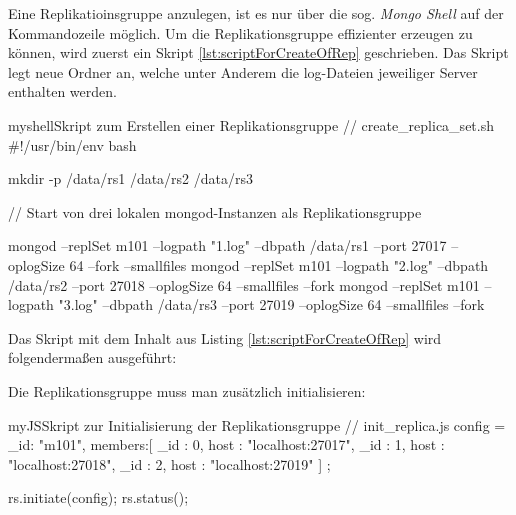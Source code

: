 Eine Replikatioinsgruppe anzulegen, ist es nur über die sog. \textit{Mongo Shell} auf der Kommandozeile möglich. Um die Replikationsgruppe effizienter erzeugen zu können, wird zuerst ein Skript \ref{lst:scriptForCreateOfRep} geschrieben. Das Skript legt neue Ordner an, welche unter Anderem die log-Dateien jeweiliger Server enthalten werden.

\begin{listingsboxShell}[label={lst:scriptForCreateOfRep}]{myshell}{Skript zum Erstellen einer Replikationsgruppe}
// create_replica_set.sh
#!/usr/bin/env bash

mkdir -p /data/rs1 /data/rs2 /data/rs3

// Start von drei lokalen mongod-Instanzen als Replikationsgruppe

mongod --replSet m101 --logpath "1.log" --dbpath /data/rs1 --port 27017
--oplogSize 64 --fork --smallfiles
mongod --replSet m101 --logpath "2.log" --dbpath /data/rs2 --port 27018
--oplogSize 64 --smallfiles --fork
mongod --replSet m101 --logpath "3.log" --dbpath /data/rs3 --port 27019
--oplogSize 64 --smallfiles --fork
\end{listingsboxShell}

Das Skript mit dem Inhalt aus Listing \ref{lst:scriptForCreateOfRep} wird folgendermaßen ausgeführt:


%

Die Replikationsgruppe muss man zusätzlich initialisieren:

\begin{listingsboxJavaScript}[label={lst:initReplica}]{myJS}{Skript zur Initialisierung der Replikationsgruppe}
// init_replica.js
config = { _id: "m101", members:[
          { _id : 0, host : "localhost:27017"},
          { _id : 1, host : "localhost:27018"},
          { _id : 2, host : "localhost:27019"} ]
};

rs.initiate(config);
rs.status();
\end{listingsboxJavaScript}

